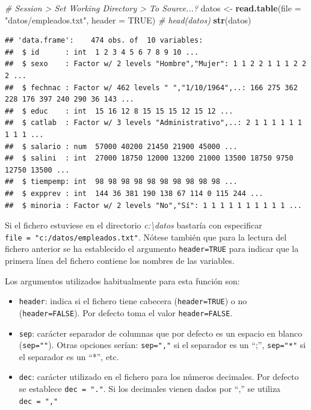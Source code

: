 \documentclass[]{book}
\newenvironment{Shaded}{\begin{snugshade}}{\end{snugshade}}
\newcommand{\CommentTok}[1]{\textcolor[rgb]{0.56,0.35,0.01}{\textit{#1}}}
\newcommand{\DataTypeTok}[1]{\textcolor[rgb]{0.13,0.29,0.53}{#1}}
\newcommand{\KeywordTok}[1]{\textcolor[rgb]{0.13,0.29,0.53}{\textbf{#1}}}
\newcommand{\NormalTok}[1]{#1}
\newcommand{\OtherTok}[1]{\textcolor[rgb]{0.56,0.35,0.01}{#1}}
\newcommand{\StringTok}[1]{\textcolor[rgb]{0.31,0.60,0.02}{#1}}
\begin{document}
\begin{Shaded}
\begin{Highlighting}[]
\CommentTok{# Session > Set Working Directory > To Source...?}
\NormalTok{datos <-}\StringTok{ }\KeywordTok{read.table}\NormalTok{(}\DataTypeTok{file =} \StringTok{"datos/empleados.txt"}\NormalTok{, }\DataTypeTok{header =} \OtherTok{TRUE}\NormalTok{)}
\CommentTok{# head(datos)}
\KeywordTok{str}\NormalTok{(datos)}
\end{Highlighting}
\end{Shaded}

\begin{verbatim}
## 'data.frame':    474 obs. of  10 variables:
##  $ id      : int  1 2 3 4 5 6 7 8 9 10 ...
##  $ sexo    : Factor w/ 2 levels "Hombre","Mujer": 1 1 2 2 1 1 1 2 2 2 ...
##  $ fechnac : Factor w/ 462 levels " ","1/10/1964",..: 166 275 362 228 176 397 240 290 36 143 ...
##  $ educ    : int  15 16 12 8 15 15 15 12 15 12 ...
##  $ catlab  : Factor w/ 3 levels "Administrativo",..: 2 1 1 1 1 1 1 1 1 1 ...
##  $ salario : num  57000 40200 21450 21900 45000 ...
##  $ salini  : int  27000 18750 12000 13200 21000 13500 18750 9750 12750 13500 ...
##  $ tiempemp: int  98 98 98 98 98 98 98 98 98 98 ...
##  $ expprev : int  144 36 381 190 138 67 114 0 115 244 ...
##  $ minoria : Factor w/ 2 levels "No","Sí": 1 1 1 1 1 1 1 1 1 1 ...
\end{verbatim}

Si el fichero estuviese en el directorio \emph{c:\textbackslash{}datos} bastaría con especificar
\texttt{file\ =\ "c:/datos/empleados.txt"}.
Nótese también que para la lectura del fichero anterior se ha
establecido el argumento \texttt{header=TRUE} para indicar que la primera línea del
fichero contiene los nombres de las variables.

Los argumentos utilizados habitualmente para esta función son:

\begin{itemize}
\item
  \texttt{header}: indica si el fichero tiene cabecera (\texttt{header=TRUE}) o no
  (\texttt{header=FALSE}). Por defecto toma el valor \texttt{header=FALSE}.
\item
  \texttt{sep}: carácter separador de columnas que por defecto es un espacio
  en blanco (\texttt{sep=""}). Otras opciones serían: \texttt{sep=","} si el separador es
  un ``;'', \texttt{sep="*"} si el separador es un ``*'', etc.
\item
  \texttt{dec}: carácter utilizado en el fichero para los números decimales.
  Por defecto se establece \texttt{dec\ =\ "."}. Si los decimales vienen dados
  por ``,'' se utiliza \texttt{dec\ =\ ","}
\end{itemize}
\end{document}
